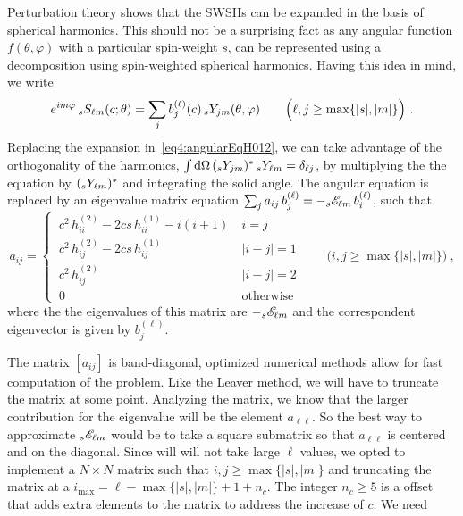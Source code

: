 Perturbation theory shows that the SWSHs can be expanded in the basis of spherical harmonics.
This should not be a surprising fact as any angular function $f(\theta,\varphi)$ with a particular spin-weight $s$, can be represented using a decomposition using spin-weighted spherical harmonics.
Having this idea in mind, we write 
\begin{align}
	e^{i m \varphi} \, \uu[s]{S}{\ell m}(c; \theta) = \sum_{j} b_{j}^{(\ell)}(c) \,\uu[s]{Y}{j m}(\theta,\varphi) \qquad \Big( \ell, j \ge \max\{|s|,|m|\} \Big) ~.
\end{align}
Replacing the expansion in~\eqref{eq4:angularEqH012}, we can take advantage of the orthogonality of the harmonics, $\int \dd\Omega \,(\uu[s]{Y}{j m})^* \,\uu[s]{Y}{\ell m} = \delta_{\ell j}$, by multiplying the the equation by $(\uu[s]{Y}{\ell m})^*$ and integrating the solid angle.
The angular equation is replaced by an eigenvalue matrix equation $\sum_{j} a_{ij} \, b_{j}^{(\ell)} = - \uu[s]{\mathscr{E}}{\ell m} \,b_{i}^{(\ell)}$, such that
\begin{equation}
	a_{ij} =
	\begin{cases} 
		~c^2 \,h^{(2)}_{ii} - 2 c s \,h^{(1)}_{ii} - i(i+1) & ~ i=j \\[-0.5ex]
		~c^2 \,h^{(2)}_{ij} - 2 c s \,h^{(1)}_{ij} & ~ |i-j|=1 \\[-0.5ex]
		~c^2 \,h^{(2)}_{ij} & ~ |i-j|=2 \\[-0.5ex]
		~0 & ~\text{otherwise}
	\end{cases}  \qquad \Big( i, j \ge \max\{|s|,|m|\} \Big) ~,
\end{equation}
where the the eigenvalues of this matrix are $-\uu[s]{\mathscr{E}}{\ell m}$ and the correspondent eigenvector is given by $b_j^{(\ell)}$.

The matrix $[a_{ij}]$ is band-diagonal, optimized numerical methods allow for fast computation of the problem.
Like the Leaver method, we will have to truncate the matrix at some point.
Analyzing the matrix, we know that the larger contribution for the eigenvalue will be the element $a_{\ell\ell}$.
So the best way to approximate $\uu[s]{\mathscr{E}}{\ell m}$ would be to take a square submatrix so that $a_{\ell\ell}$ is centered and on the diagonal.
Since will will not take large $\ell$ values, we opted to implement a $N\times N$ matrix such that $i,j\ge\max\{|s|,|m|\}$ and truncating the matrix at a $i_{\max} = \ell - \max\{|s|,|m|\} + 1 + n_{c}$.
The integer $n_c \ge 5$ is a offset that adds extra elements to the matrix to address the increase of $c$.
We need 


